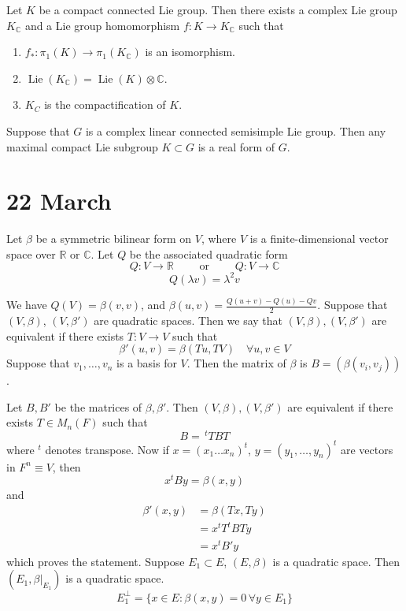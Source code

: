 \documentclass[11pt,a4paper]{scrarticle}
\theoremstyle{definition}
\theoremstyle{greenbox}
\newcommand{\R}{\mathbb{R}}
\newcommand{\C}{\mathbb{C}}
\begin{document}
\begin{thm}
    Let $ K $ be a compact connected Lie group. Then there exists a complex Lie group $ K_{\C} $ and a Lie group homomorphism $ f : K \to K_{\C} $ such that \begin{enumerate}
        \item $ f_{*} : \pi_{1}(K) \to \pi_{1}(K_{\C}) $ is an isomorphism. 
        \item $ \operatorname{Lie}(K_{\C})  = \operatorname{Lie}(K) \otimes \C$. 
        \item $ K_{C} $ is the compactification of $ K $.
    \end{enumerate}
\end{thm}

\begin{thm}
    Suppose that $ G $ is a complex linear connected semisimple Lie group. Then any maximal compact Lie subgroup $ K \subset G  $ is a real form of $ G $.
\end{thm}


\section{22 March}

Let $ \beta $ be a symmetric bilinear form on $ V $, where $ V $ is a finite-dimensional vector space over $ \R $ or $ \C $. Let $ Q $ be the associated quadratic form 
\[ Q : V \to \R \qquad \text{ or } \qquad Q : V \to \C\]
\[ Q(\lambda v) = \lambda^{2}v \]

We have $ Q(V) = \beta (v,v) $, and $ \beta(u,v) = \frac{Q(u+v) -Q(u)-Qv}{2}$. Suppose that $ (V, \beta) $, $ (V, \beta') $ are quadratic spaces. Then we say that $ (V, \beta), (V, \beta') $ are equivalent if there exists $ T : V \to V $ such that 
\[ \beta'(u,v) = \beta(Tu,TV)  \quad \forall u,v \in V\]
Suppose that $ v_{1}, \ldots, v_{n} $ is a basis for $ V $. Then the matrix of $ \beta $ is $ B = (\beta(v_{i},v_{j})) $.

Let $ B,B' $ be the matrices of $ \beta, \beta' $. Then $ (V, \beta), (V, \beta') $ are equivalent if there exists $ T \in M_{n}(F) $ such that 
\[ B = \, ^{t}TBT \]
where $ ^{t} $ denotes transpose. Now if $ x = (x_{1} \dots x_{n})^{t} $, $ y = (y_{1}, \dots, y_{n})^{t} $ are vectors in $ F^{n} \equiv V $, then 
\[ x^{t}By = \beta(x,y) \]
and 
\begin{align*}
    \beta'(x,y) & = \beta(Tx,Ty) \\
    & = x^{t}T^{t}BTy \\
    & = x^{t}B'y
\end{align*}
which proves the statement. Suppose $ E_{1} \subset E $, $ (E, \beta) $ is a quadratic space. Then $ (E_{1},\beta|_{E_{1}}) $ is a quadratic space. 
\[ E_{1}^{\perp} = \{x \in E : \beta(x,y) = 0 \, \forall y \in E_{1}\} \]
\end{document}
